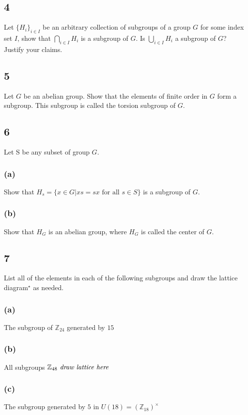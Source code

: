 \documentclass[12pt,a4]{article}
\begin{document}
\subsection*{4} Let $\{ H_i \}_{i \in I}$ be an arbitrary collection of subgroups of a group $G$ for some index set $I$, show that $\bigcap\limits_{i \in I} H_{i}$ is a subgroup of $G$. Is  $\bigcup\limits_{i \in I} H_{i}$ a subgroup of $G$? Justify your claims.

\subsection*{5} Let $G$ be an abelian group. Show that the elements of finite order in $G$ form a subgroup. This subgroup
is called the torsion subgroup of $G$.

\subsection*{6} Let S be any subset of group $G$.

    \subsubsection*{(a)} Show that $H_{s} = \{ x \in G | xs=sx \text{ for all } s \in S\}$ is a subgroup of $G$.

    \subsubsection*{(b)} Show that $H_{G}$ is an abelian group, where $H_{G}$ is called the center of $G$.

\subsection*{7} List all of the elements in each of the following subgroups and draw the lattice diagram$^\star$ as needed.

    \subsubsection*{(a)} The subgroup of $\mathbb{Z}_{24}$ generated by $15$

    \subsubsection*{(b)} All subgroups $\mathbb{Z}_{48} \text{\textit{ draw lattice here }}$

    \subsubsection*{(c)} The subgroup generated by $5$ in $U(18) =(\mathbb{Z}_{18})^{\times}$
\end{document}
